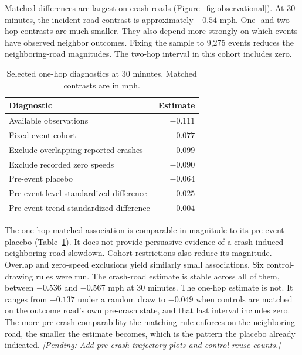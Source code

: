 \documentclass[sigconf,nonacm]{acmart}
\newcommand{\pending}[1]{\textcolor{pendinggray}{\textit{[Pending: #1]}}}
\begin{document}
Matched differences are largest on crash roads (Figure~\ref{fig:observational}). At 30 minutes, the incident-road contrast is approximately $-0.54$ mph. One- and two-hop contrasts are much smaller. They also depend more strongly on which events have observed neighbor outcomes. Fixing the sample to 9,275 events reduces the neighboring-road magnitudes. The two-hop interval in this cohort includes zero.

\begin{table}[t]
\centering
\caption{Selected one-hop diagnostics at 30 minutes. Matched contrasts are in mph.}
\label{tab:checks}
\footnotesize
\begin{tabular}{lr}
\toprule
Diagnostic & Estimate \\
\midrule
Available observations & $-0.111$ \\
Fixed event cohort & $-0.077$ \\
Exclude overlapping reported crashes & $-0.099$ \\
Exclude recorded zero speeds & $-0.090$ \\
Pre-event placebo & $-0.064$ \\
\midrule
Pre-event level standardized difference & $-0.025$ \\
Pre-event trend standardized difference & $-0.004$ \\
\bottomrule
\end{tabular}
\end{table}

The one-hop matched association is comparable in magnitude to its pre-event placebo (Table~\ref{tab:checks}). It does not provide persuasive evidence of a crash-induced neighboring-road slowdown. Cohort restrictions also reduce its magnitude. Overlap and zero-speed exclusions yield similarly small associations. Six control-drawing rules were run. The crash-road estimate is stable across all of them, between $-0.536$ and $-0.567$ mph at 30 minutes. The one-hop estimate is not. It ranges from $-0.137$ under a random draw to $-0.049$ when controls are matched on the outcome road's own pre-crash state, and that last interval includes zero. The more pre-crash comparability the matching rule enforces on the neighboring road, the smaller the estimate becomes, which is the pattern the placebo already indicated. \pending{Add pre-crash trajectory plots and control-reuse counts.}
\end{document}
